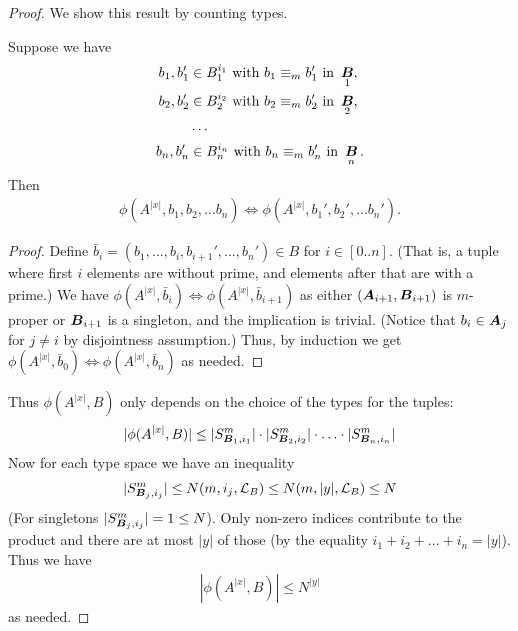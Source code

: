 \documentclass{amsart}
\DeclareMathOperator{\AT}{\boldface A}
\DeclareMathOperator{\BT}{\boldface B}
\renewcommand{\LL}{\mathcal L}
\begin{document}
\begin{proof}
  We show this result by counting types.
  \begin{Claim}
    Suppose we have
    \begin{align*}
      b_1, b_1' &\in B_1^{i_1} \text{ with } b_1 \equiv_m b_1' \text { in } \BT_1, \\
      b_2, b_2' &\in B_2^{i_2} \text{ with } b_2 \equiv_m b_2' \text { in } \BT_2, \\
                &\cdots \\
      b_n, b_n' &\in B_n^{i_n} \text{ with } b_n \equiv_m b_n' \text { in } \BT_n.
    \end{align*}
    Then
    \begin{align*}
      \phi(A^{|x|}, b_1, b_2, \ldots b_n) \iff \phi(A^{|x|}, b_1', b_2', \ldots b_n').
    \end{align*}
  \end{Claim}
  \begin{proof}
    Define $\bar b_i = (b_1, \ldots, b_i, b_{i+1}', \ldots, b_n') \in B$ for $i \in [0..n]$.
    (That is, a tuple where first $i$ elements are without prime, and elements after that are with a prime.)
    We have $\phi(A^{|x|}, \bar b_i) \iff \phi(A^{|x|}, \bar b_{i+1})$ as either $(\AT_{i+1}, \BT_{i+1})$ is $m$-proper
    or $\BT_{i+1}$ is a singleton, and the implication is trivial.
    (Notice that $b_i \in \AT_j$ for $j \neq i$ by disjointness assumption.)
    Thus, by induction we get $\phi(A^{|x|}, \bar b_0) \iff \phi(A^{|x|}, \bar b_n)$ as needed.
  \end{proof}
  Thus $\phi(A^{|x|}, B)$ only depends on the choice of the types for the tuples:
  \begin{align*}
    |\phi(A^{|x|}, B)| \leq |S^m_{\BT_1, i_1}| \cdot |S^m_{\BT_2, i_2}| \cdot \ldots \cdot |S^m_{\BT_n, i_n}|
  \end{align*}
  Now for each type space we have an inequality
  \begin{align*}
    |S^m_{\BT_j, i_j}| \leq N(m, i_j, \LL_B) \leq N(m, |y|, \LL_B) \leq N
  \end{align*}
  (For singletons $|S^m_{\BT_j, i_j}| = 1 \leq N$). Only non-zero indices contribute to the product and there are at most $|y|$ of those (by the equality $i_1 + i_2 + \ldots + i_n = |y|$). Thus we have
  \begin{align*}
    |\phi(A^{|x|}, B)| \leq N^{|y|}
  \end{align*}
  as needed.
\end{proof}
\end{document}
